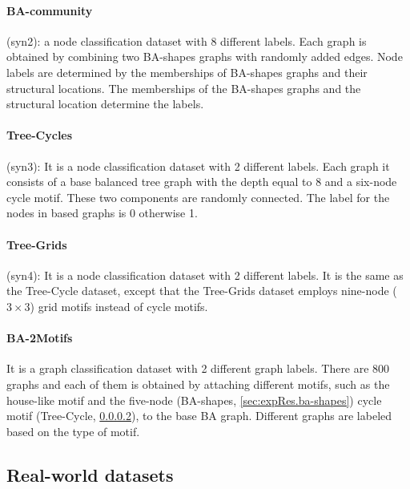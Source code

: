 \documentclass[binding=0.6cm]{sapthesis}
\begin{document}
\paragraph{BA-community}
\label{sec:expRes.ba-comms}
(syn2): a node classification dataset with 8 different labels. Each graph is obtained by combining two BA-shapes graphs with randomly added edges. Node labels are determined by the memberships of BA-shapes graphs and their structural locations. The memberships of the BA-shapes graphs and the structural location determine the labels.  

\paragraph{Tree-Cycles}
\label{sec:expRes.tree-cycles}
(syn3): It is a node classification dataset with 2 different labels. Each graph it consists of a base balanced tree graph with the depth equal to 8 and a six-node cycle motif. These two components are randomly connected. The label for the nodes in based graphs is 0 otherwise 1.


\paragraph{Tree-Grids}
\label{sec:expRes.tree-grids}
(syn4):  It is a node classification dataset with 2 different labels. It is the same as the Tree-Cycle dataset, except that the Tree-Grids dataset employs nine-node ($3\times 3$) grid motifs instead of cycle motifs.


\paragraph{BA-2Motifs}
\label{sec:expRes.ba-2motifs}
It is a graph classification dataset with 2 different graph labels. There are 800 graphs and each of them is obtained by attaching different motifs, such as the house-like motif and the five-node (BA-shapes, \cref{sec:expRes.ba-shapes}) cycle motif (Tree-Cycle, \cref{sec:expRes.tree-cycles}), to the base BA graph. Different graphs are labeled based on the type of motif.

\subsection{Real-world datasets}
\label{sec:expRes.real-dataset}
\end{document}
